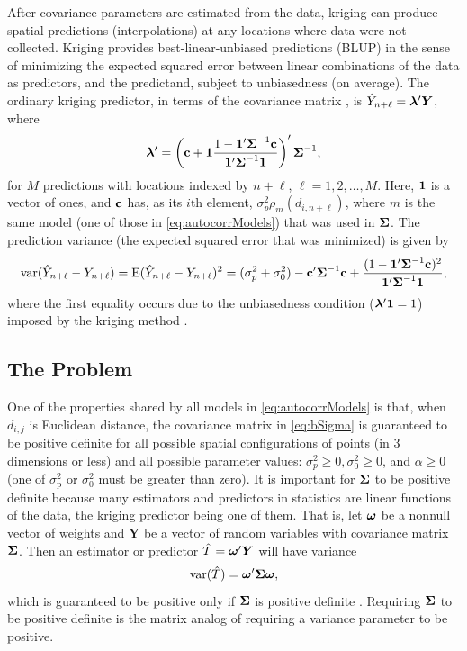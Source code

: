 \documentclass[11pt, titlepage]{article}\usepackage[]{graphicx}\usepackage[]{color}
\begin{document}
\begin{spacing}{1.9}
\begin{flushleft}
After covariance parameters are estimated from the data, kriging can produce spatial predictions (interpolations) at any locations where data were not collected.  Kriging provides best-linear-unbiased predictions (BLUP) in the sense of minimizing the expected squared error between linear combinations of the data as predictors, and the predictand, subject to unbiasedness (on average). The ordinary kriging predictor, in terms of the covariance matrix \citep[][p.33]{Scha:Gotw:stat:2005}, is $\hat{Y}_{n+\ell} ={\boldsymbol{\lambda}}^{\prime}\bm Y$, where
\begin{equation} \label{eq:OK}
	{\boldsymbol{\lambda}}^{\prime} = \left(\mathbf{c} + \mathbf{1}\frac{1 - \mathbf{1}^{\prime}\mbox{\boldmath $\Sigma$}^{-1}\mathbf{c}}{\mathbf{1}^{\prime}\mbox{\boldmath $\Sigma$}^{-1}\mathbf{1}}\right)^{\prime}\mbox{\boldmath $\Sigma$}^{-1}, 
\end{equation}
for $M$ predictions with locations indexed by $n+\ell$, $\ell = 1,2,\ldots,M$. Here, $\mathbf{1}$ is a vector of ones, and $\mathbf{c}$ has, as its $i$th element, $\sigma^2_p\rho_m(d_{i,n+\ell})$, where $m$ is the same model (one of those in \ref{eq:autocorrModels}) that was used in $\mbox{\boldmath $\Sigma$}$. The prediction variance (the expected squared error that was minimized) is given by
\begin{equation} \label{eq:OKse}
	\textrm{var}(\hat{Y}_{n+\ell} - Y_{n+\ell}) = \textrm{E}(\hat{Y}_{n+\ell} - Y_{n+\ell})^2 = (\sigma^2_p + \sigma^2_0) - \mathbf{c}^{\prime}\mbox{\boldmath $\Sigma$}^{-1}\mathbf{c} + \frac{(1 - \mathbf{1}^{\prime}\mbox{\boldmath $\Sigma$}^{-1}\mathbf{c})^2}{\mathbf{1}^{\prime}\mbox{\boldmath $\Sigma$}^{-1}\mathbf{1}},
\end{equation}
where the first equality occurs due to the unbiasedness condition (${\boldsymbol{\lambda}}^{\prime}\mathbf{1} = 1$) imposed by the kriging method \citep[e.g.,][p. 120-121]{Cres:stat:1993}.

\subsection*{The Problem}

One of the properties shared by all models in \ref{eq:autocorrModels} is that, when $d_{i,j}$ is Euclidean distance, the covariance matrix in \ref{eq:bSigma} is guaranteed to be positive definite for all possible spatial configurations of points (in 3 dimensions or less) and all possible parameter values:  $\sigma^2_p \ge 0, \sigma^2_0 \ge 0$, and $\alpha \ge 0$ (one of $\sigma^2_\textrm{p}$ or $\sigma^2_0$ must be greater than zero). It is important for $\mbox{\boldmath $\Sigma$}$ to be positive definite because many estimators and predictors in statistics are linear functions of the data, the kriging predictor being one of them.  That is, let $\mbox{\boldmath $\omega$}$ be a nonnull vector of weights and $\bm Y$ be a vector of random variables with covariance matrix $\mbox{\boldmath $\Sigma$}$.  Then an estimator or predictor $\hat{T} = \mbox{\boldmath $\omega$}^{\prime}\bm Y$ will have variance
\begin{equation} \label{eq:quadForm}
  \textrm{var}(\hat{T}) = \mbox{\boldmath $\omega$}^{\prime}\mbox{\boldmath $\Sigma$}\mbox{\boldmath $\omega$},
\end{equation}
which is guaranteed to be positive only if $\mbox{\boldmath $\Sigma$}$ is positive definite \citep{Guil:Schi:Porc:Bevi:vali:2014}.  Requiring $\mbox{\boldmath $\Sigma$}$ to be positive definite is the matrix analog of requiring a variance parameter to be positive.  


\end{flushleft}
\end{spacing}
\end{document}
